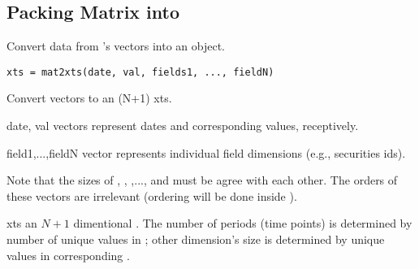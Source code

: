 \subsection{Packing Matrix into }
   Convert data from \matlab's vectors into an  object.

\usage
   \begin{lstlisting}[numbers=none]
   xts = mat2xts(date, val, fields1, ..., fieldN)
   \end{lstlisting}

   Convert vectors to an (N+1) xts.

\inarg
   \begin{argdesc}
   \item[date, val] vectors represent dates and corresponding values, receptively.
   \item[field1,...,fieldN]  vector represents individual field dimensions (e.g., securities ids).
   \end{argdesc}

   Note that the sizes of , , ,..., and 
   must be agree with each other.
   The orders of these vectors are irrelevant (ordering will be done inside ).
   
\outarg
   \begin{argdesc}
   \item[xts] an $N+1$ dimentional .
              The number of periods (time points) is determined by number of unique values in ;
              other dimension's size is determined by unique values in corresponding .
   \end{argdesc}


